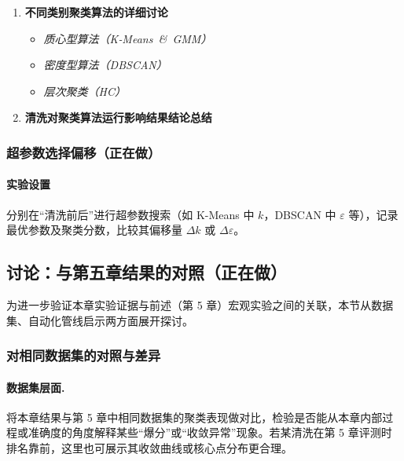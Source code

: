 \documentclass[10pt]{article} %
\numberwithin{equation}{section}
\begin{document}
\begin{enumerate}[label=(\alph*)]
    \item \textbf{不同类别聚类算法的详细讨论}
\begin{itemize}
    \item \emph{质心型算法（K‑Means \& GMM）}\\[-0.2em]
    
    \item \emph{密度型算法（DBSCAN）}\\[-0.2em]
    
    \item \emph{层次聚类（HC）}\\[-0.2em]
    
\end{itemize}

    \item \textbf{清洗对聚类算法运行影响结果结论总结}
    
\end{enumerate}


\subsubsection{超参数选择偏移（正在做）}
\label{subsec:param_shift}

\paragraph{实验设置}
分别在“清洗前后”进行超参数搜索（如 K-Means 中 $k$，DBSCAN 中 $\varepsilon$ 等），记录最优参数及聚类分数，比较其偏移量 \(\Delta k\) 或 \(\Delta \varepsilon\)。

\subsection{讨论：与第五章结果的对照（正在做）}
\label{sec:discussion}

为进一步验证本章实验证据与前述（第 5 章）宏观实验之间的关联，本节从数据集、自动化管线启示两方面展开探讨。

\subsubsection{对相同数据集的对照与差异}
\label{subsec:discussion_data}

\paragraph{数据集层面.}
将本章结果与第 5 章中相同数据集的聚类表现做对比，检验是否能从本章内部过程或准确度的角度解释某些“爆分”或“收敛异常”现象。若某清洗在第 5 章评测时排名靠前，这里也可展示其收敛曲线或核心点分布更合理。
\end{document}
